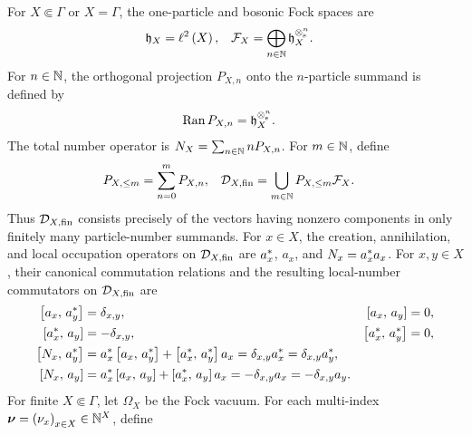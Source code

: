 \documentclass[11pt,a4paper]{article}
\theoremstyle{plain}
\theoremstyle{definition}
\theoremstyle{remark}
\begin{document}
For \(X \Subset \Gamma\) or \(X = \Gamma\), the one-particle and bosonic Fock spaces are \[\begin{aligned}
\sphilbfrak{h}_{X}
& =
\fun{\lpseq^{2}}{X},
&
\sphilb{F}_{X}
& =
\bigoplus_{n \in \monnat}\sphilbfrak{h}_{X}^{\otimes_{\txtsym}^{n}}.
\end{aligned}\] For \(n \in \mathbb{N}\), the orthogonal projection \(P_{X,n}\) onto the \(n\)-particle summand is defined by \begin{equation}
\begin{aligned}
\Ran P_{X,n}
& =
\sphilbfrak{h}_{X}^{\otimes_{\txtsym}^{n}}.
\end{aligned}
\label{eq:fock-particle-sector-projection}
\end{equation} The total number operator is \(\opfocknumber_X = \sum_{n \in \monnat}n P_{X,n}\). For \(m\in\mathbb{N}\), define \begin{equation}
\begin{aligned}
P_{X,\leq m}
& =
\sum_{n=0}^{m}P_{X,n},
&
\sphilb{D}_{X,\txtfin}
& =
\bigcup_{m\in\monnat}P_{X,\leq m}\sphilb{F}_X.
\end{aligned}
\label{eq:fock-finite-particle-subspace}
\end{equation} Thus \(\sphilb{D}_{X,\txtfin}\) consists precisely of the vectors having nonzero components in only finitely many particle-number summands. For \(x \in X\), the creation, annihilation, and local occupation operators on \(\sphilb{D}_{X,\txtfin}\) are \(a_x^{\ast}\), \(a_x\), and \(N_x = a_x^{\ast}a_x\). For \(x,y\in X\), their canonical commutation relations and the resulting local-number commutators on \(\sphilb{D}_{X,\txtfin}\) are \begin{equation}
\begin{aligned}
\left[ a_x,\,a_y^{\ast} \right]
& =
\delta_{x,y},
&
\left[ a_x,\,a_y \right]
& =
0,
\\
\left[ a_x^{\ast},\,a_y \right]
& =
-\delta_{x,y},
&
\left[ a_x^{\ast},\,a_y^{\ast} \right]
& =
0,
\\
\left[ N_x,\,a_y^{\ast} \right]
& =
a_x^{\ast}\left[ a_x,\,a_y^{\ast} \right]
+
\left[ a_x^{\ast},\,a_y^{\ast} \right]a_x
=
\delta_{x,y}a_x^{\ast}
=
\delta_{x,y}a_y^{\ast},
\\
\left[ N_x,\,a_y \right]
& =
a_x^{\ast}\left[ a_x,\,a_y \right]
+
\left[ a_x^{\ast},\,a_y \right]a_x
=
-\delta_{x,y}a_x
=
-\delta_{x,y}a_y.
\end{aligned}
\label{eq:fock-creation-annihilation-number-commutators}
\end{equation} For finite \(X \Subset \Gamma\), let \(\Omega_X\) be the Fock vacuum. For each multi-index \(\boldsymbol{\nu} = \seq{\nu_x}{x \in X} \in \monnat^X\), define \begin{equation}

\end{equation}
\end{document}
